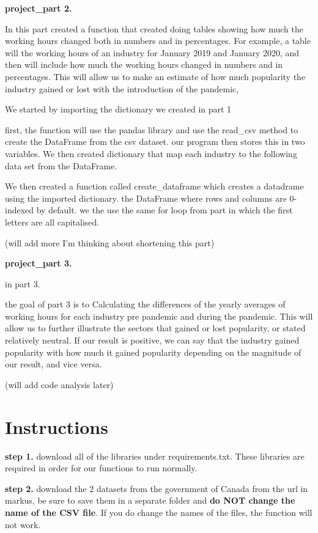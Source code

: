 \documentclass[fontsize=11pt]{article}
\begin{document}
\medskip 

\textbf{project\_part 2.}

In this part created a function that created doing tables showing how much the working hours changed both in numbers and in percentages. For example, a table will the working hours of an industry for January 2019 and January 2020, and then will include how much the working hours changed in numbers and in percentages. This will allow us to make an estimate of how much popularity the industry gained or lost with the introduction of the pandemic,

We started by importing the dictionary we created in part 1

first, the function will use the pandas library and use the read\_csv method to create the DataFrame from the csv dataset. our program then stores this in
two variables.
We then created dictionary that map each industry  to the following data set from the DataFrame.

We then created a function called create\_dataframe which creates a datadrame using the imported dictionary. the DataFrame where rows and columns are 0-indexed by default. we the use the same for loop from part in which the first letters are all capitalised.

(will add more I'm thinking about shortening this part)



\medskip 

\textbf{project\_part 3.}

in part 3.

the goal of part 3 is to Calculating the differences of the yearly averages of working hours for each industry pre pandemic and during the pandemic. This will allow us to further illustrate the sectors that gained or lost popularity, or stated relatively neutral. If our result is positive, we can say that the industry gained popularity with how much it gained popularity depending on the magnitude of our result, and vice versa.
  
 (will add code analysis later)
  
\section*{Instructions} 
 
\textbf{step 1.}
download all of the libraries under requirements.txt. These libraries are required in order for our functions to run normally.
 
\textbf{step 2.}
download the 2 datasets from the government of Canada from the url in markus, be sure to save them in a separate folder and \textbf{do NOT change the name of the CSV file}. If you do change the names of the files, the function will not work.
 
\end{document}
